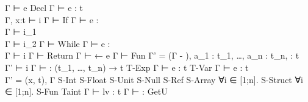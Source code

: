 {{             { Γ ⊢ e }
         }
    {Decl}{ 
              { Γ ⊢ e : t
             \\ Γ, x:t ⊢ i
              }
              { Γ ⊢  }
          }
    {If}{ 
            { Γ ⊢ e : \tInt \\
              Γ ⊢ i_1 \\
              Γ ⊢ i_2
            }
            { Γ ⊢  }
        }
    {While}{ 
               { Γ ⊢ e : \tInt \\
                 Γ ⊢ i
               }
               { Γ ⊢  }
           }
    {Return}{ 
                { Γ ⊢ \vRet ← e }
                { Γ ⊢  }
            }
    {Fun}{ 
             { Γ' = (Γ - \vRet),
                     a_1 : t_1,
                     …,
                     a_n : t_n,
                     \vRet : t \\
               Γ' ⊢ i
             }
             { Γ ⊢ 
                    : (t_1, …, t_n) → t
             }
         }
    {T-Exp}{ 
                { Γ ⊢ e : t }
                {  }
            }
    {T-Var}{ 
                { Γ ⊢ e : t \\
                  Γ' = (x, t), Γ
                }
                {  }
            }
    {S-Int}{ 
               { }
               {}
           }
    {S-Float}{ 
                 { }
                 {}
    }
    {S-Unit}{ 
                { }
                {}
    }
    {S-Null}{ 
                { }
                {}
    }
    {S-Ref}{ 
               {}
               {}
    }
    {S-Array}{ 
                 { ∀i ∈ [1;n]. }
                 {  }
    }
    {S-Struct}{ 
                  { ∀i ∈ [1;n].  }
                  { 
                                        {  }
                  }
    }
    {S-Fun}{ 
               { }
               {}
    }
    {Taint}{ 
                 { Γ ⊢ lv : t }
                 { Γ ⊢  :  }
    }
    {GetU}{ 
}}
